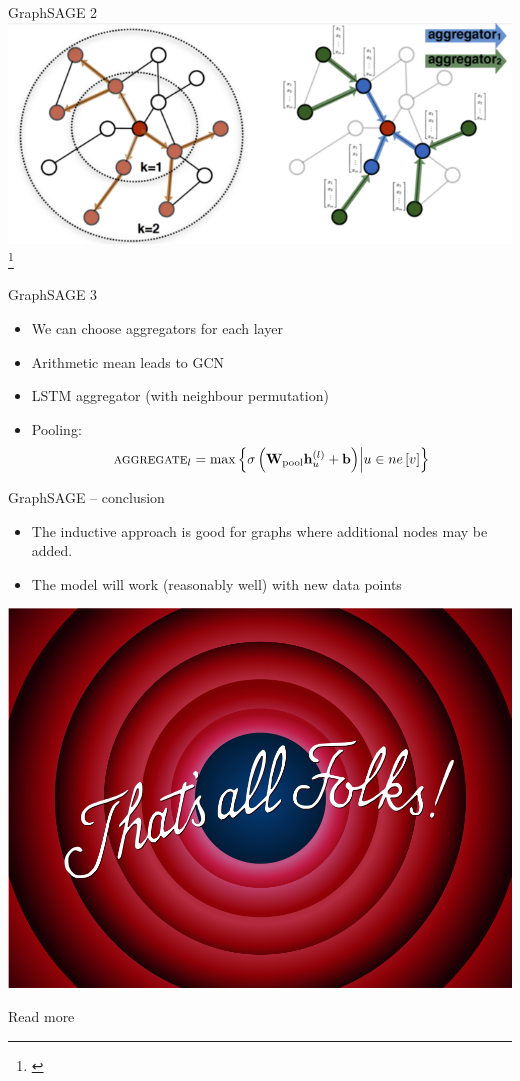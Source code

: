\documentclass[10pt]{beamer}
\newcommand{\mathvec}{\ensuremath{\mathbf}}
\newcommand{\mathmat}{\ensuremath{\mathbf}}
\begin{document}
\begin{frame}{GraphSAGE 2}
	\centering
	\includegraphics[width=0.7\pagewidth]{images/GraphSAGE.png}\footnote{\cite{hamilton_inductive_2017}}
\end{frame}

\begin{frame}{GraphSAGE 3}
	\begin{itemize}
		\item We can choose aggregators for each layer
		\item Arithmetic mean leads to GCN
		\item LSTM aggregator (with neighbour permutation)
		\item Pooling:
			\[ \textsc{aggregate}_l = \max \left\{ \sigma \left( \mathmat{W}_{\mathrm{pool}} \mathvec{h}_u^{(l)} + \mathvec{b} \right) \middle| u \in ne \left[ v \right] \right\} \]
	\end{itemize}
\end{frame}

\begin{frame}{GraphSAGE -- conclusion}
	\begin{itemize}
		\item The inductive approach is good for graphs where additional nodes may be added.
		\item The model will work (reasonably well) with new data points
	\end{itemize}
\end{frame}

\begin{frame}
	\centering
	\includegraphics[width=0.75\pagewidth]{images/thats-all.png}
\end{frame}

\begin{frame}[allowframebreaks]{Read more}
	\printbibliography
\end{frame}
\end{document}
